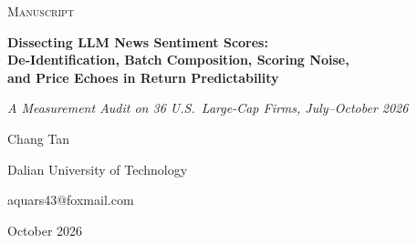 \thispagestyle{plain}
\enlargethispage{24pt}

\begin{center}
{\color{darkgray}\scshape Manuscript}\par
\vspace{8pt}
{\LARGE\bfseries\color{black} Dissecting LLM News Sentiment Scores:}\\[4pt]
{\LARGE\bfseries\color{black} De-Identification, Batch Composition, Scoring Noise,}\\[4pt]
{\LARGE\bfseries\color{black} and Price Echoes in Return Predictability}\par
\vspace{12pt}
{\large\itshape A Measurement Audit on 36 U.S.\ Large-Cap Firms, July--October 2026}\par
\vspace{14pt}
{\normalsize Chang Tan}\par
{\small\color{darkgray} Dalian University of Technology}\par
{\small\color{darkgray} aquars43@foxmail.com}\par
\vspace{6pt}
{\small\color{darkgray} October 2026}\par
\end{center}

